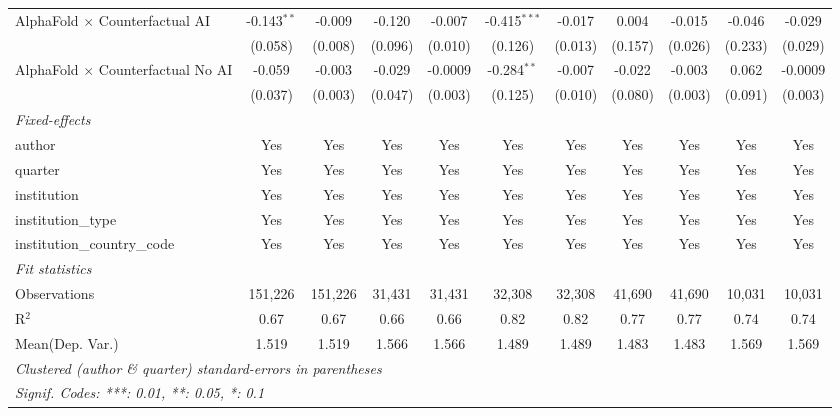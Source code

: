 \begin{tabular}{lcccccccccc}
   AlphaFold $\times$ Counterfactual AI     & -0.143$^{**}$ & -0.009       & -0.120       & -0.007  & -0.415$^{***}$ & -0.017      & 0.004   & -0.015  & -0.046  & -0.029\\   
                                            & (0.058)       & (0.008)      & (0.096)      & (0.010) & (0.126)        & (0.013)     & (0.157) & (0.026) & (0.233) & (0.029)\\   
   AlphaFold $\times$ Counterfactual No AI  & -0.059        & -0.003       & -0.029       & -0.0009 & -0.284$^{**}$  & -0.007      & -0.022  & -0.003  & 0.062   & -0.0009\\   
                                            & (0.037)       & (0.003)      & (0.047)      & (0.003) & (0.125)        & (0.010)     & (0.080) & (0.003) & (0.091) & (0.003)\\   
   \midrule
   \emph{Fixed-effects}\\
   author                                   & Yes           & Yes          & Yes          & Yes     & Yes            & Yes         & Yes     & Yes     & Yes     & Yes\\  
   quarter                                  & Yes           & Yes          & Yes          & Yes     & Yes            & Yes         & Yes     & Yes     & Yes     & Yes\\  
   institution                              & Yes           & Yes          & Yes          & Yes     & Yes            & Yes         & Yes     & Yes     & Yes     & Yes\\  
   institution\_type                        & Yes           & Yes          & Yes          & Yes     & Yes            & Yes         & Yes     & Yes     & Yes     & Yes\\  
   institution\_country\_code               & Yes           & Yes          & Yes          & Yes     & Yes            & Yes         & Yes     & Yes     & Yes     & Yes\\  
   \midrule
   \emph{Fit statistics}\\
   Observations                             & 151,226       & 151,226      & 31,431       & 31,431  & 32,308         & 32,308      & 41,690  & 41,690  & 10,031  & 10,031\\  
   R$^2$                                    & 0.67          & 0.67         & 0.66         & 0.66    & 0.82           & 0.82        & 0.77    & 0.77    & 0.74    & 0.74\\  
Mean(Dep. Var.) & 1.519 & 1.519 & 1.566 & 1.566 & 1.489 & 1.489 & 1.483 & 1.483 & 1.569 & 1.569 \\
   \midrule \midrule
   \multicolumn{11}{l}{\emph{Clustered (author \& quarter) standard-errors in parentheses}}\\
   \multicolumn{11}{l}{\emph{Signif. Codes: ***: 0.01, **: 0.05, *: 0.1}}\\
\end{tabular}
\par\endgroup
